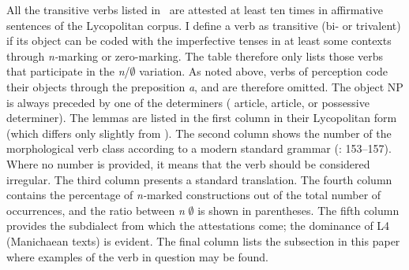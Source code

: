 \documentclass[output=paper]{LSP/langsci}
\begin{document}
All the transitive verbs listed in~ are attested at least ten times in affirmative sentences of the Lycopolitan  corpus. I define a verb as transitive (bi- or trivalent) if its object can be coded with the imperfective tenses in at least some contexts through \textit{n-}marking or zero-marking. The table therefore only lists those verbs that participate in the \textit{n}/${\emptyset}$ variation. As noted above, verbs of perception code their objects through the preposition \textit{a}, and are therefore omitted. The object NP is always preceded by one of the determiners ( article,  article, or possessive determiner). The lemmas are listed in the first column in their Lycopolitan form (which differs only slightly from ). The second column shows the number of the morphological verb class according to a modern standard grammar (\citealt{Layton2000Coptic}: 153–157). Where no number is provided, it means that the verb should be considered irregular. The third column presents a standard translation. The fourth column contains the percentage of \textit{n-}marked constructions out of the total number of occurrences, and the ratio between \textit{n} \vs ${\emptyset}$ is shown in parentheses. The fifth column provides the subdialect from which the attestations come; the dominance of L4 (Manichaean texts) is evident. The final column lists the subsection in this paper where examples of the verb in question may be found. 
\end{document}
